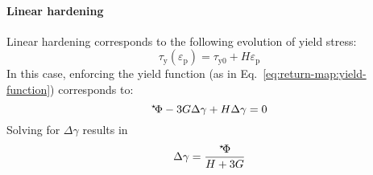 \documentclass[garamond]{goose-article}
\newcommand\ST[1]{\hspace*{-.3em}~^\star\!#1}
\begin{document}
\paragraph{Linear hardening}

Linear hardening corresponds to the following evolution of yield stress:
\begin{equation}
  \tau_\mathrm{y} ( \varepsilon_\mathrm{p} ) = \tau_\mathrm{y0} + H \varepsilon_\mathrm{p}
\end{equation}
In this case, enforcing the yield function (as in Eq.~\eqref{eq:return-map:yield-function}) corresponds to:
\begin{equation}
  \ST{\Phi} - 3 G \Delta \gamma + H \Delta \gamma = 0
\end{equation}
Solving for $\Delta \gamma$ results in
\begin{equation}
  \Delta \gamma = \frac{\ST{\Phi}}{H + 3G}
\end{equation}
\end{document}
